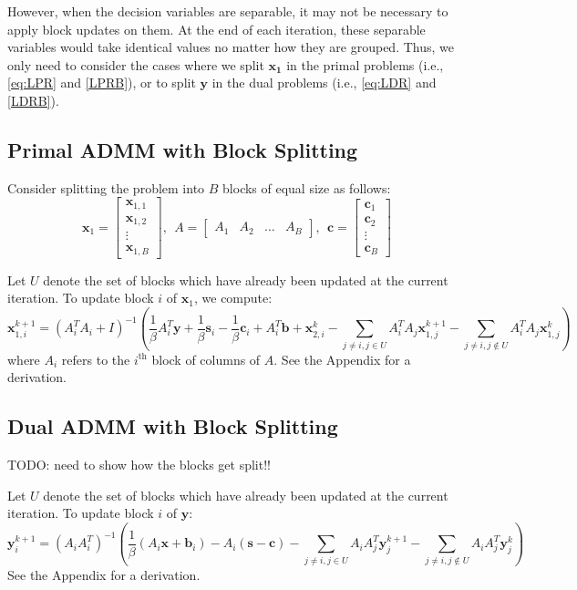 \documentclass{article}
\begin{document}
However, when the decision variables are separable, it may not be necessary to apply block updates on them. At the end of each iteration, these separable variables would take identical values no matter how they are grouped. Thus, we only need to consider the cases where we split $\mathbf{x_1}$ in the primal problems (i.e.,  \eqref{eq:LPR} and \eqref{LPRB}), or to split $\mathbf{y}$ in the dual problems (i.e.,  \eqref{eq:LDR} and \eqref{LDRB}).

\subsection*{Primal ADMM with Block Splitting}

Consider splitting the problem into $B$ blocks of equal size as follows:
\[
\mathbf{x}_{1}=\begin{bmatrix}
\mathbf{x}_{1,1}\\
\mathbf{x}_{1,2}\\
\vdots \\
\mathbf{x}_{1,B}
\end{bmatrix},
 \ \  
A=\begin{bmatrix}A_{1} & A_{2} & \dots & A_{B} \end{bmatrix},
\ \ 
\mathbf{c}=\begin{bmatrix}
\mathbf{c}_{1}\\
\mathbf{c}_{2}\\
\vdots \\
\mathbf{c}_{B}
\end{bmatrix}
\]

Let $U$ denote the set of blocks which have already been updated at the current iteration. To update block $i$ of $\mathbf{x}_{1}$, we compute:
\[
\mathbf{x}_{1,i}^{k+1}=\left(A_{i}^{T}A_{i}+I\right)^{-1}\left(\frac{1}{\beta}A_{i}^{T}\mathbf{y}+\frac{1}{\beta}\mathbf{s}_{i}-\frac{1}{\beta}\mathbf{c}_{i}+A_{i}^{T}\mathbf{b}+\mathbf{x}_{2,i}^{k}-\sum_{j\neq i,j\in U}A_{i}^{T}A_{j}\mathbf{x}_{1,j}^{k+1}-\sum_{j\neq i,j\notin U}A_{i}^{T}A_{j}\mathbf{x}_{1,j}^{k}\right)
\]
where $A_{i}$ refers to the $i^{\text{th}}$ block of columns of $A$. See the Appendix for a derivation.

\subsection*{Dual ADMM with Block Splitting}

TODO: need to show how the blocks get split!!

Let $U$ denote the set of blocks which have already been updated at the current iteration. To update block $i$ of $\mathbf{y}$:
\[
\mathbf{y}_{i}^{k+1}=\left(A_{i}A_{i}^{T}\right)^{-1}\left(\frac{1}{\beta}\left(A_{i}\mathbf{x}+\mathbf{b}_{i}\right)-A_{i}\left(\mathbf{s}-\mathbf{c}\right)-\sum_{j\neq i,j\in U}A_{i}A_{j}^{T}\mathbf{y}_{j}^{k+1}-\sum_{j\neq i,j\notin U}A_{i}A_{j}^{T}\mathbf{y}_{j}^{k}\right)
\]
See the Appendix for a derivation.
\end{document}
